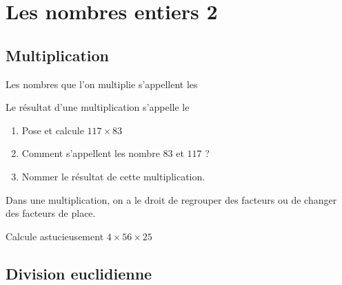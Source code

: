\documentclass[a4paper,10pt]{report}
\begin{document}
\setcounter{chapter}{2}
\chapter{Les nombres entiers 2}

\section{Multiplication}

\begin{defn}
Les nombres que l'on multiplie s'appellent les \dotfill

\medskip \noindent Le résultat d'une multiplication s'appelle le \dotfill
\end{defn}

\begin{ex}

\noindent \begin{minipage}{7.35cm}
\begin{enumerate}
\item Pose et calcule $117\times 83$
\item Comment s'appellent les nombre $83$ et $117$ ?
\item Nommer le résultat de cette multiplication.
\end{enumerate} 
\end{minipage}
\hspace{5mm}
\begin{minipage}{8.9cm}
\noindent\grandscarreaux{\linewidth}{2.4cm}
\end{minipage}

\vspace{-0.5mm}
\noindent\grandscarreaux{\linewidth}{4.8cm}
\end{ex}

\begin{prop}
Dans une multiplication, on a le droit de regrouper des facteurs ou de changer des facteurs de place.
\end{prop}

\begin{ex}
Calcule astucieusement $4\times 56 \times25$

\medskip\noindent\grandscarreaux{\linewidth}{2.4cm}
\end{ex} 

\section{Division euclidienne}
\end{document}
